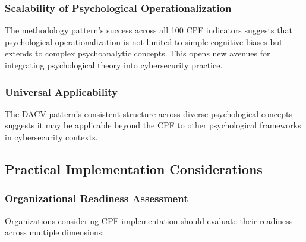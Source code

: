 \documentclass[11pt, onecolumn]{article}
\begin{document}
\subsubsection{Scalability of Psychological Operationalization}

The methodology pattern's success across all 100 CPF indicators suggests that psychological operationalization is not limited to simple cognitive biases but extends to complex psychoanalytic concepts. This opens new avenues for integrating psychological theory into cybersecurity practice.

\subsubsection{Universal Applicability}

The DACV pattern's consistent structure across diverse psychological concepts suggests it may be applicable beyond the CPF to other psychological frameworks in cybersecurity contexts.

\subsection{Practical Implementation Considerations}

\subsubsection{Organizational Readiness Assessment}

Organizations considering CPF implementation should evaluate their readiness across multiple dimensions:
\end{document}
